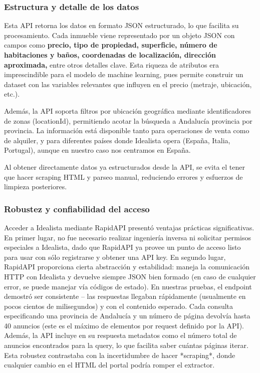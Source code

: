 \documentclass[a4paper,11pt]{book}
\begin{document}
\subsubsection{Estructura y detalle de los datos}

Esta API retorna los datos en formato JSON estructurado, lo que facilita su procesamiento. Cada inmueble viene representado por un objeto JSON con campos como \textbf{precio, tipo de propiedad, superficie, número de habitaciones y baños, coordenadas de localización, dirección aproximada,} entre otros detalles clave. Esta riqueza de atributos era imprescindible para el modelo de machine learning, pues permite construir un dataset con las variables relevantes que influyen en el precio (metraje, ubicación, etc.). 

Además, la API soporta filtros por ubicación geográfica mediante identificadores de zonas (locationId), permitiendo acotar la búsqueda a Andalucía provincia por provincia. La información está disponible tanto para operaciones de venta como de alquiler, y para diferentes países donde Idealista opera (España, Italia, Portugal), aunque en nuestro caso nos centramos en España. 

Al obtener directamente datos ya estructurados desde la API, se evita el tener que hacer scraping HTML y parseo manual, reduciendo errores y esfuerzos de limpieza posteriores.

\subsubsection{Robustez y confiabilidad del acceso}
Acceder a Idealista mediante RapidAPI presentó ventajas prácticas significativas. En primer lugar, no fue necesario realizar ingeniería inversa ni solicitar permisos especiales a Idealista, dado que RapidAPI ya provee un punto de acceso listo para usar con sólo registrarse y obtener una API key. En segundo lugar, RapidAPI proporciona cierta abstracción y estabilidad: maneja la comunicación HTTP con Idealista y devuelve siempre JSON bien formado (en caso de cualquier error, se puede manejar vía códigos de estado). En nuestras pruebas, el endpoint demostró ser consistente – las respuestas llegaban rápidamente (usualmente en pocos cientos de milisegundos) y con el contenido esperado. Cada consulta especificando una provincia de Andalucía y un número de página devolvía hasta 40 anuncios (este es el máximo de elementos por request definido por la API). Además, la API incluye en su respuesta metadatos como el número total de anuncios encontrados para la query, lo que facilita saber cuántas páginas iterar. Esta robustez contrastaba con la incertidumbre de hacer *scraping*, donde cualquier cambio en el HTML del portal podría romper el extractor.
\end{document}
